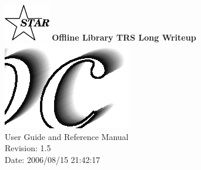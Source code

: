 \documentclass[twoside]{article}
\begin{document}
%
%
\begin{titlepage}
\pagestyle{empty}
\vspace*{-35mm}
\begin{center}
  \mbox{\includegraphics[width=2cm]{StarIcon.eps}}
  {\Large\bf Offline Library TRS Long Writeup}
  \hfill\mbox{}\\[3cm]
  \mbox{\includegraphics[width=\textwidth]{trsTitle.eps}}
  \hfill\mbox{}\\[3cm]
  {\LARGE User Guide and Reference Manual}\\[2cm]
  {\LARGE $ $Revision: 1.5 $ $}  \\[5mm] %
  {\LARGE $ $Date: 2006/08/15 21:42:17 $ $}  %
  \vfill
\end{center}
\cleardoublepage
\end{titlepage}

%
%
\tableofcontents
\cleardoublepage

%
%
\end{document}
